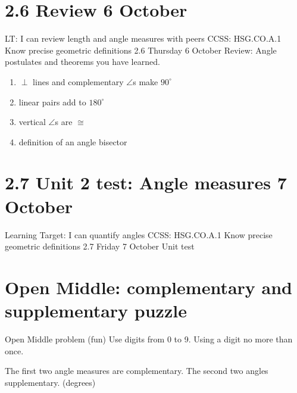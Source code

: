 \section{2.6 Review \hfill 6 October}
\begin{frame}{LT: I can review length and angle measures with peers}
  {CCSS: HSG.CO.A.1 Know precise geometric definitions  \hfill \alert{2.6 Thursday 6 October}}
  Review: Angle postulates and theorems you have learned. 
  \begin{enumerate}
    \item $\perp$ lines and complementary $\angle$s make $90^\circ$
    \item linear pairs add to $180^\circ$
    \item vertical $\angle$s are $\cong$
    \item definition of an angle bisector
  \end{enumerate}
\end{frame}

\section{2.7 Unit 2 test: Angle measures \hfill 7 October}
\begin{frame}{Learning Target: I can quantify angles}
  {CCSS: HSG.CO.A.1 Know precise geometric definitions \hfill \alert{2.7 Friday 7 October}}
    \alert{Unit test}
  \end{frame}

\section{Open Middle: complementary and supplementary puzzle}
\begin{frame}{Open Middle problem (fun)}
  {Use digits from 0 to 9. Using a digit no more than once.}
    \begin{block}{The first two angle measures are complementary. The second two angles supplementary. (degrees)}
      \begin{center}
    \end{center}
    \end{block} \vspace{1cm} 
\end{frame}


